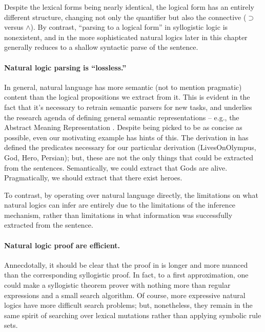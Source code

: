 Despite the lexical forms being nearly identical, the logical form has an entirely different
  structure, changing not only the quantifier but also the connective ($\supset$ versus $\land$).
By contrast, ``parsing to a logical form'' in syllogistic logic is nonexistent, and
  in the more sophisticated natural logics later in this chapter generally reduces to a
  shallow syntactic parse of the sentence.

\paragraph{Natural logic parsing is ``lossless.''}
In general, natural language has more semantic (not to mention pragmatic)
  content than the logical propositions we extract from it.
This is evident in the fact that it's necessary to retrain semantic parsers for new tasks, and underlies
  the research agenda of defining general semantic representations -- e.g., the Abstract Meaning
  Representation \cite{key:2013banarescu-amr}.
Despite being picked to be as concise as possible, even our motivating example
  has hints of this.
The derivation in  has defined the predicates necessary
  for our particular derivation (LivesOnOlympus, God, Hero, Persian); but, these are not
  the only things that could be extracted from the sentences.
Semantically, we could extract that Gods are alive.
Pragmatically, we should extract that there exist heroes.

To contrast, by operating over natural language directly, the limitations on what
  natural logics can infer are entirely due to the limitations of the inference
  mechanism, rather than limitations in what information was successfully extracted
  from the sentence.

\paragraph{Natural logic proof are efficient.}
Annecdotally, it should be clear that the proof in  is
  longer and more nuanced than the corresponding syllogistic proof.
In fact, to a first approximation, one could make a syllogistic theorem prover with
  nothing more than regular expressions and a small search algorithm.
Of course, more expressive natural logics have more difficult search problems;
  but, nonetheless, they remain in the same spirit of searching over lexical mutations
  rather than applying symbolic rule sets.

